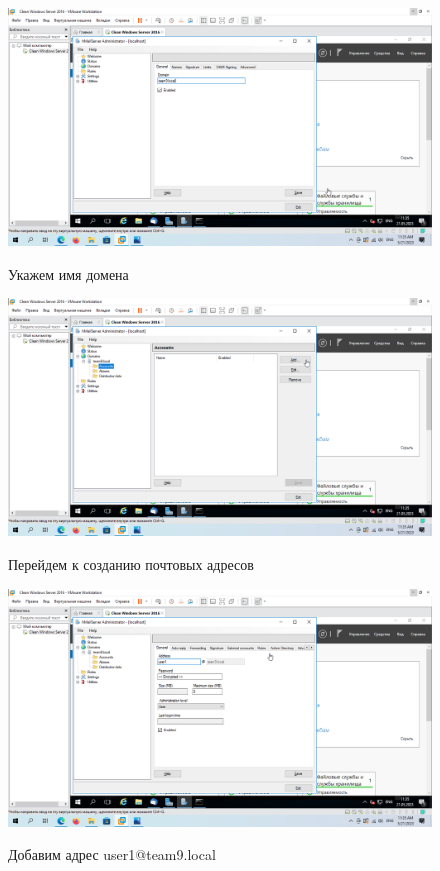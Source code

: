 \documentclass[a4paper]{article}
\begin{document}
  \begin{figure}[H]
    \centering
    \includegraphics[width=\textwidth]{11_0135}
    \label{img:135}
    \caption{Укажем имя домена}
  \end{figure}

  \begin{figure}[H]
    \centering
    \includegraphics[width=\textwidth]{11_0136}
    \label{img:136}
    \caption{Перейдем к созданию почтовых адресов}
  \end{figure}

  \begin{figure}[H]
    \centering
    \includegraphics[width=\textwidth]{11_0137}
    \label{img:137}
    \caption{Добавим адрес user1@team9.local}
  \end{figure}
\end{document}
